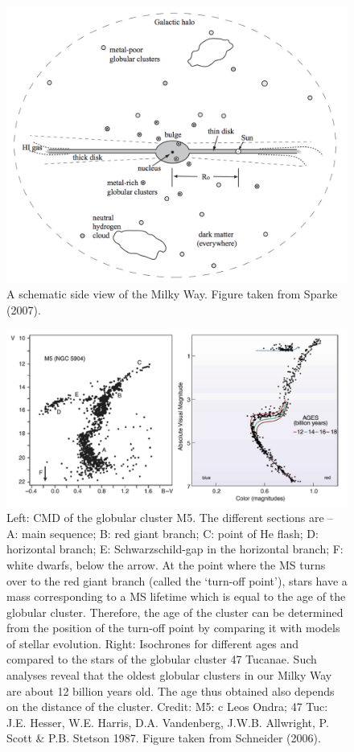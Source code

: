 \documentclass[a4paper,11pt]{article}
\begin{document}
\begin{figure}[t!]
    \includegraphics[width=14cm]{figures/MWGschematic.png}
    \centering
    \caption{A schematic side view of the Milky Way. Figure taken from Sparke (2007).}
    \label{fig:mwgschematic}
\end{figure}

\begin{figure}[t!]
    \includegraphics[width=16cm]{figures/GlobularClusters.png}
    \centering
    \caption{\footnotesize{Left: CMD of the globular cluster M5. The different sections are -- A: main sequence; B: red giant branch; C: point of He flash; D: horizontal branch; E: Schwarzschild-gap in the horizontal branch; F: white dwarfs, below the arrow. At the point where the MS turns over to the red giant branch (called the `turn-off point'), stars have a mass corresponding to a MS lifetime which is equal to the age of the globular cluster. Therefore, the age of the cluster can be determined from the position of the turn-off point by comparing it with models of stellar evolution. Right: Isochrones for different ages and compared to the stars of the globular cluster 47 Tucanae. Such analyses reveal that the oldest globular clusters in our Milky Way are about 12 billion years old. The age thus obtained also depends on the distance of the cluster. Credit: M5: c Leos Ondra; 47 Tuc: J.E. Hesser, W.E. Harris, D.A. Vandenberg, J.W.B. Allwright, P. Scott \& P.B. Stetson 1987. Figure taken from Schneider (2006).}}
    \label{fig:globularclusters}
\end{figure}
\end{document}

